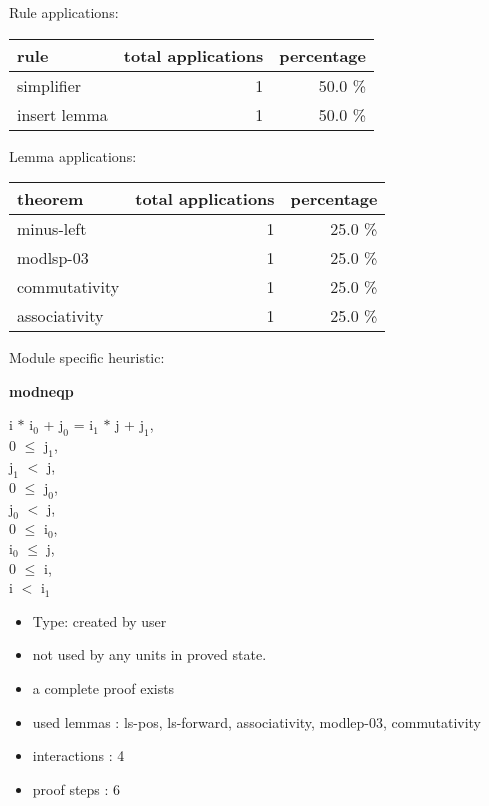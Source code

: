 \documentclass[a4paper]{article}
\begin{document}
Rule applications:

\begin{supertabular}{l|r|r}
rule	        & total applications & percentage \\ \hline
simplifier & 1 & 50.0 \% \\
insert lemma & 1 & 50.0 \% \\

\end{supertabular}

Lemma applications:

\begin{supertabular}{l|r|r}
theorem	        & total applications & percentage \\ \hline
minus-left & 1 & 25.0 \% \\
modlsp-03 & 1 & 25.0 \% \\
commutativity & 1 & 25.0 \% \\
associativity & 1 & 25.0 \% \\

\end{supertabular}

Module specific heuristic:

\pagebreak

{\LARGE\bf modneqp}\label{lemma-modneqp}

\medskip

i $*$ $\mbox{i}_{0}$ + $\mbox{j}_{0}$ = $\mbox{i}_{1}$ $*$ j + $\mbox{j}_{1}$, \\
0 $\le$ $\mbox{j}_{1}$, \\
$\mbox{j}_{1}$ $<$ j, \\
0 $\le$ $\mbox{j}_{0}$, \\
$\mbox{j}_{0}$ $<$ j, \\
0 $\le$ $\mbox{i}_{0}$, \\
$\mbox{i}_{0}$ $\le$ j, \\
0 $\le$ i, \\
i $<$ $\mbox{i}_{1}$ \Fol 

\begin{itemize}

\item Type: created by user

\item not used by any units in proved state.
\item       a complete proof exists
\item       used lemmas  : ls-pos, ls-forward, associativity, modlep-03, commutativity
\item       interactions : 4
\item       proof steps  : 6
\end{itemize}
\end{document}
